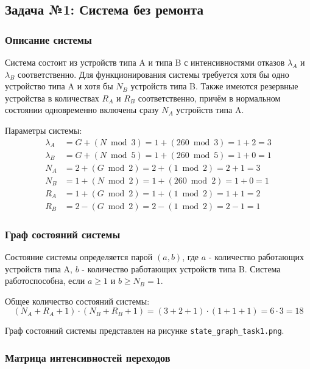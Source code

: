 \subsection{Задача №1: Система без ремонта}\label{sec:First}

\subsubsection{Описание системы}

Система состоит из устройств типа A и типа B с интенсивностями отказов $\lambda_A$ и $\lambda_B$ соответственно. Для функционирования системы требуется хотя бы одно устройство типа A и хотя бы $N_B$ устройств типа B. Также имеются резервные устройства в количествах $R_A$ и $R_B$ соответственно, причём в нормальном состоянии одновременно включены сразу $N_A$ устройств типа A.

Параметры системы:
\begin{align}
\lambda_A &= G + (N \bmod 3) = 1 + (260 \bmod 3) = 1 + 2 = 3 \\
\lambda_B &= G + (N \bmod 5) = 1 + (260 \bmod 5) = 1 + 0 = 1 \\
N_A &= 2 + (G \bmod 2) = 2 + (1 \bmod 2) = 2 + 1 = 3 \\
N_B &= 1 + (N \bmod 2) = 1 + (260 \bmod 2) = 1 + 0 = 1 \\
R_A &= 1 + (G \bmod 2) = 1 + (1 \bmod 2) = 1 + 1 = 2 \\
R_B &= 2 - (G \bmod 2) = 2 - (1 \bmod 2) = 2 - 1 = 1
\end{align}

\subsubsection{Граф состояний системы}

Состояние системы определяется парой $(a, b)$, где $a$ - количество работающих устройств типа A, $b$ - количество работающих устройств типа B. Система работоспособна, если $a \geq 1$ и $b \geq N_B = 1$.

Общее количество состояний системы:
\begin{equation}
(N_A + R_A + 1) \cdot (N_B + R_B + 1) = (3 + 2 + 1) \cdot (1 + 1 + 1) = 6 \cdot 3 = 18
\end{equation}

Граф состояний системы представлен на рисунке \texttt{state\_graph\_task1.png}.

\subsubsection{Матрица интенсивностей переходов}

